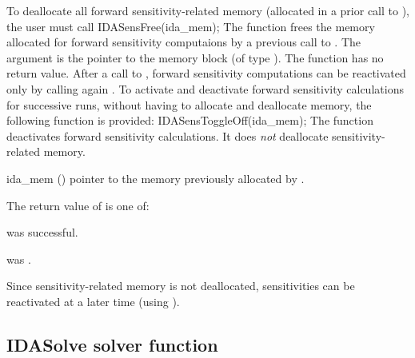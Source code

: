 To deallocate all forward sensitivity-related memory (allocated in a prior call
to ), the user must call
{
  IDASensFree(ida\_mem);
}
{
  The function  frees the memory allocated for forward sensitivity 
  computaions by a previous call to .
}
{
  The argument is the pointer to the {\idas} memory block (of type ).
}
{
  The function  has no return value.
}
{
  After a call to , forward sensitivity computations can be reactivated
  only by calling again .
}
To activate and deactivate forward sensitivity calculations for successive {\idas} runs,
without having to allocate and deallocate memory, the following function is provided:
{
  IDASensToggleOff(ida\_mem);
}
{
  The function  deactivates forward sensitivity 
  calculations. It does {\em not} deallocate sensitivity-related memory.
}
{
  \begin{args}
  \item[ida\_mem] ()
    pointer to the memory previously allocated by .
  \end{args}
}
{
  The return value  of  is one of:
  \begin{args}
  \item[\Id{IDA\_SUCCESS}] 
     was successful.
  \item[\Id{IDA\_MEM\_NULL}] 
     was .
  \end{args}
}
{
  Since sensitivity-related memory is not deallocated, sensitivities can
  be reactivated at a later time (using ).
}


\subsection{IDASolve solver function}

